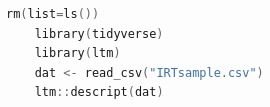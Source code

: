 \begin{lstlisting}[language=c++,label={code:11_01},caption={データの読み込みから記述統計量の計算まで}]
    rm(list=ls())
    library(tidyverse)
    library(ltm)
    dat <- read_csv("IRTsample.csv")
    ltm::descript(dat)
\end{lstlisting}
